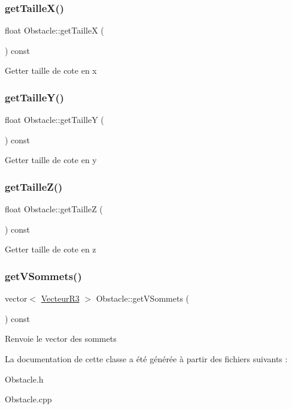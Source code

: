 \subsubsection{\texorpdfstring{get\+Taille\+X()}{getTailleX()}}
{\footnotesize\ttfamily float Obstacle\+::get\+TailleX (\begin{DoxyParamCaption}{ }\end{DoxyParamCaption}) const}

Getter taille de cote en x \mbox{\label{class_obstacle_a14415e4953536b30e2ebf57112a92807}} 
\subsubsection{\texorpdfstring{get\+Taille\+Y()}{getTailleY()}}
{\footnotesize\ttfamily float Obstacle\+::get\+TailleY (\begin{DoxyParamCaption}{ }\end{DoxyParamCaption}) const}

Getter taille de cote en y \mbox{\label{class_obstacle_ab2267f4612ffb80352494525040e8f91}} 
\subsubsection{\texorpdfstring{get\+Taille\+Z()}{getTailleZ()}}
{\footnotesize\ttfamily float Obstacle\+::get\+TailleZ (\begin{DoxyParamCaption}{ }\end{DoxyParamCaption}) const}

Getter taille de cote en z \mbox{\label{class_obstacle_a5d69ba210a162084a37e246e3afc8574}} 
\subsubsection{\texorpdfstring{get\+V\+Sommets()}{getVSommets()}}
{\footnotesize\ttfamily vector$<$ \mbox{\hyperlink{class_vecteur_r3}{Vecteur\+R3}} $>$ Obstacle\+::get\+V\+Sommets (\begin{DoxyParamCaption}{ }\end{DoxyParamCaption}) const}

Renvoie le vector des sommets 

La documentation de cette classe a été générée à partir des fichiers suivants \+:\begin{DoxyCompactItemize}
\item 
Obstacle.\+h\item 
Obstacle.\+cpp\end{DoxyCompactItemize}
